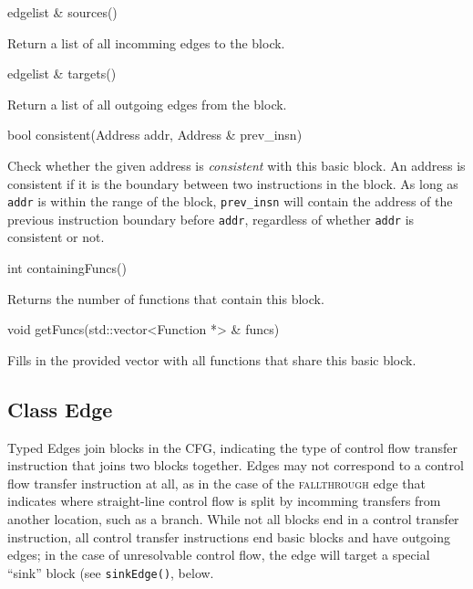 \documentclass{article}
\newenvironment{apient}{\small\verbatim}{\endverbatim}
\newcommand{\apidesc}[1]{%
{\addtolength{\leftskip}{4em}%
#1\par\medskip}
}
\begin{document}
\begin{apient}
edgelist & sources()
\end{apient}
\apidesc{Return a list of all incomming edges to the block.}

\begin{apient}
edgelist & targets()
\end{apient}
\apidesc{Return a list of all outgoing edges from the block.}

\begin{apient}
bool consistent(Address addr, Address & prev_insn)
\end{apient}
\apidesc{Check whether the given address is \emph{consistent} with this basic block. An address is consistent if it is the boundary between two instructions in the block. As long as \texttt{addr} is within the range of the block, \texttt{prev\_insn} will contain the address of the previous instruction boundary before \texttt{addr}, regardless of whether \texttt{addr} is consistent or not.}

\begin{apient}
int containingFuncs()
\end{apient}
\apidesc{Returns the number of functions that contain this block.}

\begin{apient}
void getFuncs(std::vector<Function *> & funcs)
\end{apient}
\apidesc{Fills in the provided vector with all functions that share this basic block.}

\subsection{Class Edge}

Typed Edges join blocks in the CFG, indicating the type of control flow
transfer instruction that joins two blocks together. Edges may not correspond
to a control flow transfer instruction at all, as in the case of the {\scshape
fallthrough} edge that indicates where straight-line control flow is split by
incomming transfers from another location, such as a branch. While not all
blocks end in a control transfer instruction, all control transfer instructions
end basic blocks and have outgoing edges; in the case of unresolvable control
flow, the edge will target a special ``sink'' block (see \texttt{sinkEdge()},
below.
\end{document}
